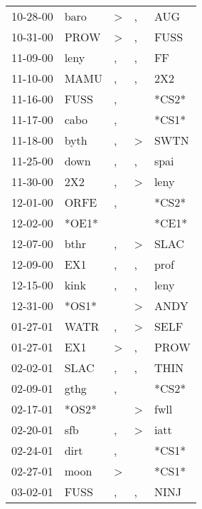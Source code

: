 \begin{supertabular}{lllll}
 10-28-00 &   baro &     \textgreater &                , &    AUG \\
 10-31-00 &   PROW &     \textgreater &                , &   FUSS \\
 11-09-00 &   leny &                , &                , &     FF \\
 11-10-00 &   MAMU &                , &                , &    2X2 \\
 11-16-00 &   FUSS &                , &                  &  *CS2* \\
 11-17-00 &   cabo &                , &                  &  *CS1* \\
 11-18-00 &   byth &                , &     \textgreater &   SWTN \\
 11-25-00 &   down &                , &                , &   spai \\
 11-30-00 &    2X2 &                , &     \textgreater &   leny \\
 12-01-00 &   ORFE &                , &                  &  *CS2* \\
 12-02-00 &  *OE1* &                  &                  &  *CE1* \\
 12-07-00 &   bthr &                , &     \textgreater &   SLAC \\
 12-09-00 &    EX1 &                , &                , &   prof \\
 12-15-00 &   kink &                , &                , &   leny \\
 12-31-00 &  *OS1* &                  &     \textgreater &   ANDY \\
 01-27-01 &   WATR &                , &     \textgreater &   SELF \\
 01-27-01 &    EX1 &     \textgreater &                , &   PROW \\
 02-02-01 &   SLAC &                , &                , &   THIN \\
 02-09-01 &   gthg &                , &                  &  *CS2* \\
 02-17-01 &  *OS2* &                  &     \textgreater &   fwll \\
 02-20-01 &    sfb &                , &     \textgreater &   iatt \\
 02-24-01 &   dirt &                , &                  &  *CS1* \\
 02-27-01 &   moon &     \textgreater &                  &  *CS1* \\
 03-02-01 &   FUSS &                , &                , &   NINJ \\

\end{supertabular}
